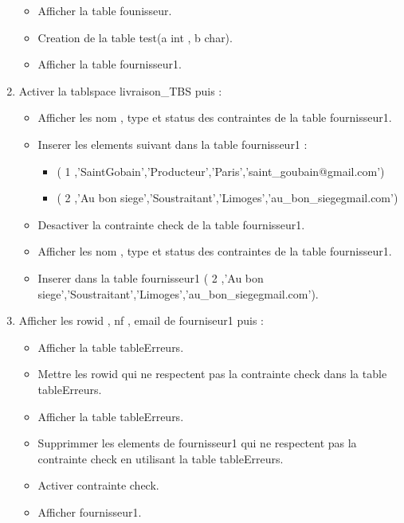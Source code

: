 \documentclass{article}
\begin{document}
\begin{enumerate}
    \begin{itemize}
        \item Afficher la table founisseur.
        \item Creation de la table test(a int , b char).
        \item Afficher la table fournisseur1.
    \end{itemize}
\item Activer la tablspace livraison\_TBS puis : 
    \begin{itemize}
        \item Afficher les nom , type et status des contraintes de la table fournisseur1.
        \item Inserer les elements suivant dans la table fournisseur1 :
            \begin{itemize}
 \item ( 1 ,'SaintGobain','Producteur','Paris','saint\_goubain@gmail.com') 
\item ( 2 ,'Au bon siege','Soustraitant','Limoges','au\_bon\_siegegmail.com') 
            \end{itemize}
        \item Desactiver la contrainte check de la table fournisseur1.
        \item Afficher les nom , type et status des contraintes de la table fournisseur1.
        \item Inserer dans la table fournisseur1 ( 2 ,'Au bon siege','Soustraitant','Limoges','au\_bon\_siegegmail.com').
  \end{itemize}
\newpage
\item Afficher les rowid , nf , email de fourniseur1 puis :
    \begin{itemize} 
    \item Afficher la table tableErreurs.
    \item Mettre les rowid qui ne respectent pas la contrainte check dans la table tableErreurs.
    \item Afficher la table tableErreurs.
    \item Supprimmer les elements de fournisseur1 qui ne respectent pas la contrainte check en utilisant la table tableErreurs.
    \item Activer contrainte check.
    \item Afficher fournisseur1.
    \end{itemize}
\end{enumerate}
\end{document}
